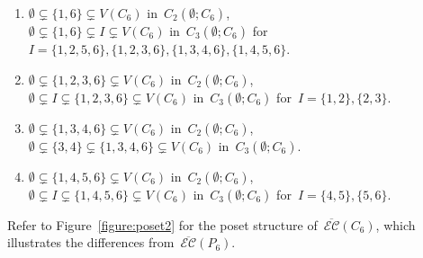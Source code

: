 \documentclass[10pt]{amsart}
\theoremstyle{plain}
\numberwithin{equation}{section}
\theoremstyle{definition}
\newcommand{\EC}{\mathcal{E}\mathcal{C}}
\newcommand{\comp}{\overline{\EC}}
\begin{document}
\begin{enumerate}
  \item[(2)] $\emptyset \subsetneq \{1,6\} \subsetneq V(C_6)$ in~$C_2(\emptyset;C_6)$,\\[0.4em]
  $\emptyset \subsetneq \{1,6\} \subsetneq I \subsetneq V(C_6)$ in~$C_3(\emptyset;C_6)$ for~$I = \{1,2,5,6\},\{1,2,3,6\},\{1,3,4,6\},\{1,4,5,6\}$.\vspace{.4em}

  \item[(3)] $\emptyset \subsetneq \{1,2,3,6\} \subsetneq V(C_6)$ in~$C_2(\emptyset;C_6)$,\\[0.4em]
  $\emptyset \subsetneq I \subsetneq \{1,2,3,6\} \subsetneq V(C_6)$ in~$C_3(\emptyset;C_6)$ for~$I = \{1,2\},\{2,3\}$.\vspace{.4em}

  \item[(4)] $\emptyset \subsetneq \{1,3,4,6\} \subsetneq V(C_6)$ in~$C_2(\emptyset;C_6)$,\\[0.4em]
  $\emptyset \subsetneq \{3,4\} \subsetneq \{1,3,4,6\} \subsetneq V(C_6)$ in~$C_3(\emptyset;C_6)$.\vspace{.4em}

  \item[(5)] $\emptyset \subsetneq \{1,4,5,6\} \subsetneq V(C_6)$ in~$C_2(\emptyset;C_6)$,\\[0.4em]
 $\emptyset \subsetneq I \subsetneq \{1,4,5,6\} \subsetneq V(C_6)$ in~$C_3(\emptyset;C_6)$ for~$I = \{4,5\},\{5,6\}$.
\end{enumerate}
Refer to Figure~\ref{figure:poset2} for the poset structure of~$\comp(C_6)$, which illustrates the differences from~$\comp(P_6)$.
\end{document}
